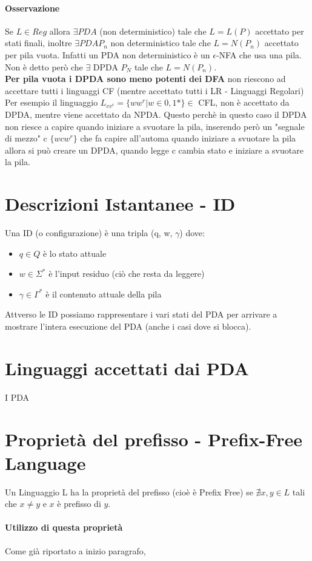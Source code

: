 
\paragraph*{Osservazione} Se $L\in Reg$ allora $\exists PDA$ (non deterministico)
tale che $L=L(P)$ accettato per stati finali, inoltre $\exists PDA P_n$ non deterministico tale che 
$L=N(P_n)$ accettato per pila vuota. Infatti un PDA non deterministico è un $\epsilon$-NFA che usa una pila.
\\ Non è detto però che $\exists$ DPDA $P_N$ tale che $L=N(P_n)$.
\\\textbf{Per pila vuota i DPDA sono meno potenti dei DFA} 
non riescono ad accettare tutti i linguaggi CF (mentre accettato tutti i LR - Linguaggi Regolari)
Per esempio il linguaggio $L_{vv^r} = \{ww^r | w \in {0,1}*\} \in$ CFL, non è accettato
da DPDA, mentre viene accettato da NPDA. Questo perchè in questo caso il DPDA non riesce
a capire quando iniziare a svuotare la pila, inserendo però un "segnale di mezzo" c $\{wcw^r\}$
che fa capire all'automa quando iniziare a svuotare la pila allora si può creare un DPDA, quando legge c
cambia stato e iniziare a svuotare la pila.
\section{Descrizioni Istantanee - ID}
Una ID (o configurazione) è una tripla (q, w, $\gamma$) dove:
\begin{itemize}
    \item $q \in Q$ è lo stato attuale
    \item $w \in \Sigma^*$ è l'input residuo (ciò che resta da leggere)
    \item $\gamma \in \Gamma^*$ è il contenuto attuale della pila
\end{itemize}
Attverso le ID possiamo rappresentare i vari stati del PDA per arrivare a
mostrare l'intera esecuzione del PDA (anche i casi dove si blocca).
\section{Linguaggi accettati dai PDA}
I PDA  
\section{Proprietà del prefisso - Prefix-Free Language}
\label{sec:Prefix-Free}
Un Linguaggio L ha la proprietà del prefisso (cioè è Prefix Free) se $\nexists x,y \in L$ tali che $x \neq y$ e $x$
è prefisso di $y$. 
\paragraph*{Utilizzo di questa proprietà} Come già riportato a inizio paragrafo, 